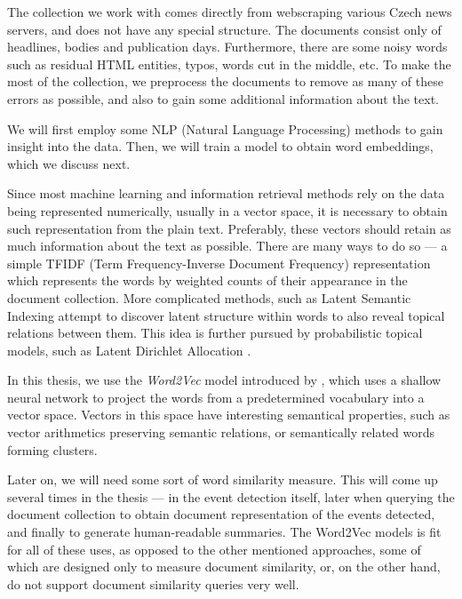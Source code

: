 The collection we work with comes directly from webscraping various Czech news servers, and does not have any special structure. The documents consist only of headlines, bodies and publication days. Furthermore, there are some noisy words such as residual HTML entities, typos, words cut in the middle, etc. To make the most of the collection, we preprocess the documents to remove as many of these errors as possible, and also to gain some additional information about the text.

We will first employ some NLP (Natural Language Processing) methods to gain insight into the data. Then, we will train a model to obtain word embeddings, which we discuss next.

Since most machine learning and information retrieval methods rely on the data being represented numerically, usually in a vector space, it is necessary to obtain such representation from the plain text. Preferably, these vectors should retain as much information about the text as possible. There are many ways to do so --- a simple TFIDF (Term Frequency-Inverse Document Frequency) representation \cite{information-retrieval} which represents the words by weighted counts of their appearance in the document collection. More complicated methods, such as Latent Semantic Indexing \cite{lsi} attempt to discover latent structure within words to also reveal topical relations between them. This idea is further pursued by probabilistic topical models, such as Latent Dirichlet Allocation \cite{lda}.

In this thesis, we use the \textit{Word2Vec} model introduced by \cite{word2vec, distributed-representations, linguistic-regularities}, which uses a shallow neural network to project the words from a predetermined vocabulary into a vector space. Vectors in this space have interesting semantical properties, such as vector arithmetics preserving semantic relations, or semantically related words forming clusters.

Later on, we will need some sort of word similarity measure. This will come up several times in the thesis --- in the event detection itself, later when querying the document collection to obtain document representation of the events detected, and finally to generate human-readable summaries. The Word2Vec models is fit for all of these uses, as opposed to the other mentioned approaches, some of which are designed only to measure document similarity, or, on the other hand, do not support document similarity queries very well.


